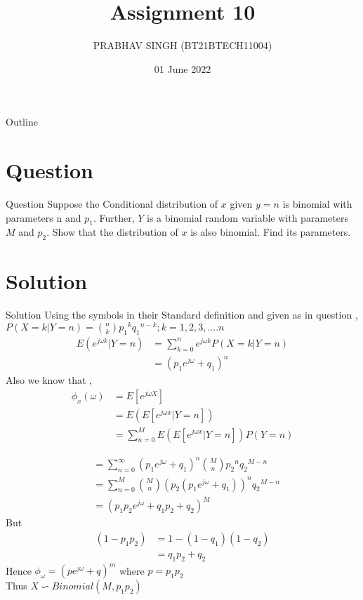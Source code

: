 \documentclass{beamer}
\title{Assignment 10}
\author{PRABHAV SINGH (BT21BTECH11004)}
\date{01 June 2022}
\begin{document}
	
	\begin{frame}
		\titlepage 
	\end{frame}
	
	\logo{}
	
	
	\begin{frame}{Outline}
		\tableofcontents
	\end{frame}
	
	\section{Question}
	\begin{frame}{Question}
	Suppose the Conditional distribution of $ x $ given $ y = n $ is binomial with parameters n and 
	$ p_{1} $. Further, $  Y $ is a binomial random variable with parameters $  M $ and $ p_{2} $. Show that the 
	distribution of $  x  $ is also binomial. Find its parameters.  \\
	\end{frame}
	
	
	\section{Solution}
	\begin{frame}{Solution}
	Using the symbols in their Standard  definition and given as in question ,
	$ 	P(X=k|Y=n) =\binom{n}{k}{p_{1}}^{k}{q_{1}}^{n-k}; k=1,2,3,....n $  \\
	\begin{align}
		E(e^{j{\omega}k}|Y=n)&=\sum_{k=0}^{n}e^{j{\omega}k}P(X=k|Y=n)\\
		&={(p_{1}e^{j{\omega}}+q_{1})}^{n}
	\end{align}
Also we know that ,
\begin{align}
	{\phi}_{x}({\omega})&=E[e^{j{\omega}X}]\\
	&=E(E[e^{j{\omega}x}|Y=n])\\
	&=\sum_{n=0}^{M}E(E[e^{j{\omega}x}|Y=n])P(Y=n)
	\end{align}
\end{frame} 
	
	\begin{frame}
		\begin{align}
			&=\sum_{n=0}^{{\infty}}{(p_{1}e^{j{\omega}}+q_{1})}^{n}\binom{M}{n}{p_{2}}^{n}{q_{2}}^{M-n}\\
			&=\sum_{n=0}^{M}\binom{M}{n}{(p_{2}(p_{1}e^{j{\omega}}+q_{1}))}^{n}{q_{2}}^{M-n}\\
			&= {(p_{1}p_{2}e^{j{\omega}}+q_{1}p_{2}+q_{2})}^{M}
		\end{align}
	But 
	\begin{align}
		(1-p_{1}p_{2} )&= 1- (1-q_{1})(1-q_{2})\\
		&= q_{1}p_{2}+q_{2}
	\end{align}
	Hence 
	{ \textbf{$ {\phi}_{{\omega}}={(pe^{j{\omega}}+q)}^{m} $}} where $ p=p_{1}p_{2} $ \\
	Thus $ \boxed{X \backsim Binomial(M,p_{1}p_{2})} $
\end{frame}
\end{document}
